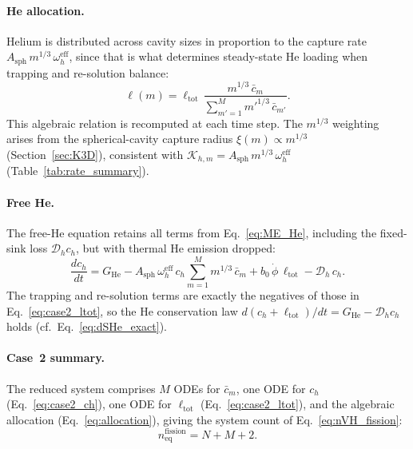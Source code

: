 \documentclass[pdflatex,sn-basic]{sn-jnl} %
\begin{document}
\paragraph{He allocation.}
Helium is distributed across cavity sizes in proportion to the capture
rate $A_{\mathrm{sph}}\,m^{1/3}\,\omega_h^{\mathrm{eff}}$, since that
is what determines steady-state He loading when trapping and re-solution
balance:
\begin{equation}\label{eq:allocation}
    \ell(m)
    = \ell_{\mathrm{tot}}\,
      \frac{m^{1/3}\,\bar{c}_m}
           {\displaystyle\sum_{m'=1}^{M} m'^{1/3}\,\bar{c}_{m'}}.
\end{equation}
This algebraic relation is recomputed at each time step. The
$m^{1/3}$ weighting arises from the spherical-cavity capture radius
$\xi(m) \propto m^{1/3}$ (Section~\ref{sec:K3D}), consistent with
$\mathcal{K}_{h,m} = A_{\mathrm{sph}}\,m^{1/3}\,\omega_h^{\mathrm{eff}}$
(Table~\ref{tab:rate_summary}).

\paragraph{Free He.}
The free-He equation retains all terms from Eq.~\eqref{eq:ME_He},
including the fixed-sink loss $\mathcal{D}_h c_h$, but with thermal
He emission dropped:
\begin{equation}\label{eq:case2_ch}
    \frac{dc_h}{dt}
    = G_{\mathrm{He}}
    - A_{\mathrm{sph}}\,\omega_h^{\mathrm{eff}}\,c_h
      \sum_{m=1}^{M} m^{1/3}\,\bar{c}_m
    + b_0\,\dot{\phi}\,\ell_{\mathrm{tot}}
    - \mathcal{D}_h\,c_h.
\end{equation}
The trapping and re-solution terms are exactly the negatives of those
in Eq.~\eqref{eq:case2_ltot}, so the He conservation law
$d(c_h + \ell_{\mathrm{tot}})/dt = G_{\mathrm{He}} - \mathcal{D}_h c_h$
holds (cf.\ Eq.~\ref{eq:dSHe_exact}).

\paragraph{Case~2 summary.}
The reduced system comprises $M$ ODEs for $\bar{c}_m$, one ODE for
$c_h$ (Eq.~\ref{eq:case2_ch}), one ODE for $\ell_{\mathrm{tot}}$
(Eq.~\ref{eq:case2_ltot}), and the algebraic allocation
(Eq.~\ref{eq:allocation}), giving the system count of
Eq.~\eqref{eq:nVH_fission}:
\begin{equation*}
    n_{\mathrm{eq}}^{\mathrm{fission}} = N + M + 2.
\end{equation*}
\end{document}
